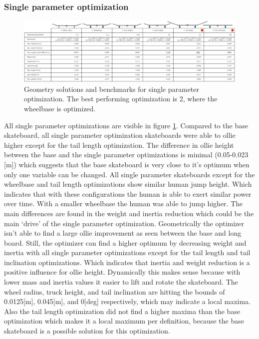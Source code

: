 \subsubsection{Single parameter optimization}

\begin{figure}[t]
    \centering
    \includegraphics[trim={0cm 0cm 0cm 0cm},clip,width=\textwidth]{figure/Results/single_optimization_table_dpi600.png}
    \caption[Geometry solutions and benchmarks for single parameter optimization]{Geometry solutions and benchmarks for single parameter optimization. The best performing optimization is 2, where the wheelbase is optimized.}
    \label{f_singlepar}
\end{figure}
\noindent All single parameter optimizations are visible in figure \ref{f_singlepar}. Compared to the base skateboard, all single parameter optimization skateboards were able to ollie higher except for the tail length optimization. The difference in ollie height between the base and the single parameter optimizations is minimal (0.05-0.023 [m]) which suggests that the base skateboard is very close to it's optimum when only one variable can be changed. All single parameter skateboards except for the wheelbase and tail length optimizations show similar human jump height. Which indicates that with these configurations the human is able to exert similar power over time. With a smaller wheelbase the human was able to jump higher. The main differences are found in the weight and inertia reduction which could be the main `drive' of the single parameter optimization. Geometrically the optimizer isn't able to find a large ollie improvement as seen between the base and long board. Still, the optimizer can find a higher optimum by decreasing weight and inertia with all single parameter optimizations except for the tail length and tail inclination optimizations. Which indicates that inertia and weight reduction is a positive influence for ollie height. Dynamically this makes sense because with lower mass and inertia values it easier to lift and rotate the skateboard. The wheel radius, truck height, and tail inclination are hitting the bounds of 0.0125[m], 0.045[m], and 0[deg] respectively, which may indicate a local maxima. Also the tail length optimization did not find a higher maxima than the base optimization which makes it a local maximum per definition, because the base skateboard is a possible solution for this optimization.

